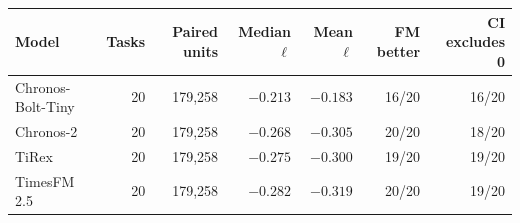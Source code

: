\begin{tabular}{lrrrrrr}
\toprule
Model & Tasks & Paired units & Median $\ell$ & Mean $\ell$ & FM better & CI excludes 0 \\
\midrule
Chronos-Bolt-Tiny & 20 & 179,258 & $-0.213$ & $-0.183$ & 16/20 & 16/20 \\
Chronos-2 & 20 & 179,258 & $-0.268$ & $-0.305$ & 20/20 & 18/20 \\
TiRex & 20 & 179,258 & $-0.275$ & $-0.300$ & 19/20 & 19/20 \\
TimesFM 2.5 & 20 & 179,258 & $-0.282$ & $-0.319$ & 20/20 & 19/20 \\
\bottomrule
\end{tabular}
